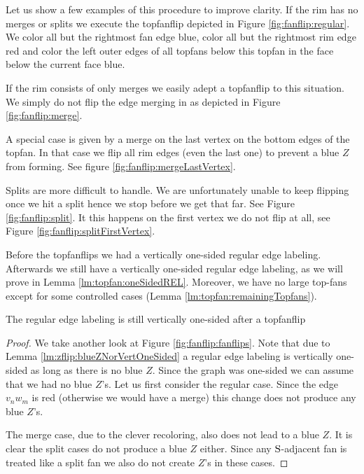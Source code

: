   Let us show a few examples of this procedure to improve clarity.
  If the rim has no merges or splits we execute the topfanflip depicted in Figure \ref{fig:fanflip:regular}.
  We color all but the rightmost fan edge blue, color all but the rightmost rim edge red and color the left outer edges of all topfans below this topfan in the face below the current face blue.

  If the rim consists of only merges we easily adept a topfanflip to this situation. We simply do not flip the edge merging in as depicted in Figure \ref{fig:fanflip:merge}.

  A special case is given by a merge on the last vertex on the bottom edges of the topfan. In that case we flip all rim edges (even the last one) to prevent a blue $Z$ from forming. See figure \ref{fig:fanflip:mergeLastVertex}.

  Splits are more difficult to handle. We are unfortunately unable to keep flipping once we hit a split hence we stop before we get that far. See Figure \ref{fig:fanflip:split}. It this happens on the first vertex we do not flip at all, see Figure \ref{fig:fanflip:splitFirstVertex}.

Before the topfanflips we had a vertically one-sided regular edge labeling. Afterwards we still have a vertically one-sided regular edge labeling, as we will prove in Lemma \ref{lm:topfan:oneSidedREL}. Moreover, we have no large top-fans except for some controlled cases (Lemma \ref{lm:topfan:remainingTopfans}).

\begin{lemma}
  \label{lm:topfan:oneSidedREL}
  The regular edge labeling is still vertically one-sided after a topfanflip
\end{lemma}
\begin{proof}
  We take another look at Figure \ref{fig:fanflip:fanflips}. Note that due to Lemma \ref{lm:zflip:blueZNorVertOneSided} a regular edge labeling is vertically one-sided as long as there is no blue $Z$.  Since the graph was one-sided we can assume that we had no blue $Z$'s.
  Let us first consider the regular case. Since the edge  $v_n w_m$ is red (otherwise we would have a merge) this change does not produce any blue $Z$'s.

  The merge case, due to the clever recoloring, also does not lead to a blue $Z$.
  It is clear the split cases do not produce a blue $Z$ either.
  Since any $\mathrm{S}$-adjacent fan is treated like a split fan we also do not create $Z$'s in these cases.
\end{proof}



